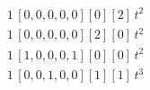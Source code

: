\begin{align*}
1\,[0,0,0,0,0] [0] [2]\,t^{2} \\
1\,[0,0,0,0,0] [2] [0]\,t^{2} \\
1\,[1,0,0,0,1] [0] [0]\,t^{2} \\
1\,[0,0,1,0,0] [1] [1]\,t^{3}
\end{align*}
